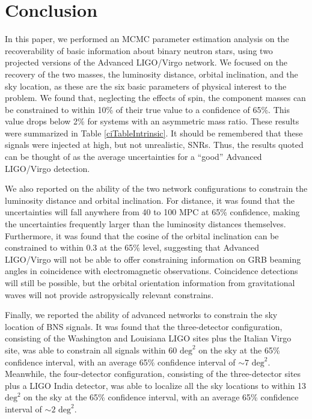 \documentclass[11pt,a4paper]{emulateapj} 
\newcommand{\will}[1]{{\color{cyan} #1}}
\begin{document}
\section{Conclusion}
\label{conclusionSection}

In this paper, we performed an MCMC parameter estimation analysis on
the recoverability of basic information about binary neutron stars,
using two projected versions of the Advanced LIGO/Virgo network.  We
focused on the recovery of the two masses, the luminosity distance,
orbital inclination, and the sky location, as these are the six basic
parameters of physical interest to the problem.  We found that,
neglecting the effects of spin, the component masses can be
constrained to within 10\% of their true value to a confidence of
65\%.  This value drops below 2\% for systems with an asymmetric mass
ratio.  These results were summarized in Table \ref{ciTableIntrinsic}.
It should be remembered that these signals were injected at high, 
but not unrealistic, SNRs.  Thus, the results quoted can be thought of as the
average uncertainties for a ``good'' Advanced LIGO/Virgo detection.

 
We also reported on the ability of the two network configurations to
constrain the luminosity distance and orbital inclination.  For
distance, it was found that the uncertainties will fall anywhere from
40 to 100 MPC at 65\% confidence, making the uncertainties frequently
larger than the luminosity distances themselves.  Furthermore, it was
found that the cosine of the orbital inclination can be constrained to
within 0.3 at the 65\% level, suggesting that Advanced LIGO/Virgo will not
be able to offer constraining information on GRB beaming angles in coincidence
with electromagnetic observations.  Coincidence detections will still be possible, but
the orbital orientation information from gravitational waves will 
not provide astropysically relevant constrains.

Finally, we reported the ability of advanced networks to constrain the
sky location of BNS signals.  It was found that the three-detector
configuration, consisting of the Washington and Louisiana LIGO sites
plus the Italian Virgo site, was able to constrain all signals within
60 $\mathrm{deg}^2$ on the sky at the 65\% confidence interval, with
an average 65\% confidence interval of $\sim 7$ $\mathrm{deg}^2$.
Meanwhile, the four-detector configuration, consisting of the
three-detector sites plus a LIGO India detector, was able to localize
all the sky locations to within 13 $\mathrm{deg}^2$ on the sky at the 65\%
confidence interval, with an average 65\% confidence interval of $\sim
2$ $\mathrm{deg}^2$.
\end{document}
